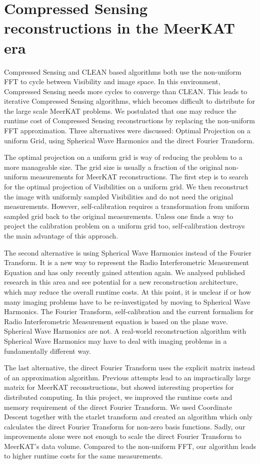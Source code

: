 \section{Compressed Sensing reconstructions in the MeerKAT era}
Compressed Sensing and CLEAN based algorithms both use the non-uniform FFT to cycle between Visibility and image space. In this environment, Compressed Sensing needs more cycles to converge than CLEAN. This leads to iterative Compressed Sensing algorithms, which becomes difficult to distribute for the large scale MeerKAT problems. We postulated that one may reduce the runtime cost of Compressed Sensing reconstructions by replacing the non-uniform FFT approximation. Three alternatives were discussed: Optimal Projection on a uniform Grid, using Spherical Wave Harmonics and the direct Fourier Transform.

The optimal projection on a uniform grid is way of reducing the problem to a more manageable size. The grid size is usually a fraction of the original non-uniform measurements for MeerKAT reconstructions. The first step is to search for the optimal projection of Visibilities on a uniform grid. We then reconstruct the image with uniformly sampled Visibilities and do not need the original measurements. However, self-calibration requires a transformation from uniform sampled grid back to the original measurements. Unless one finds a way to project the calibration problem on a uniform grid too, self-calibration destroys the main advantage of this approach.

The second alternative is using Spherical Wave Harmonics instead of the Fourier Transform. It is a new way to represent the Radio Interferometric Measurement Equation and has only recently gained attention again. We analysed published research in this area\cite{carozzi2015imaging, mcewen2008simulating} and see potential for a new reconstruction architecture, which may reduce the overall runtime costs. At this point, it is unclear if or how many imaging problems have to be re-investigated by moving to Spherical Wave Harmonics. The Fourier Transform, self-calibration and the current formalism for Radio Interferometric Measurement equation is based on the plane wave\cite{smirnov2011revisiting}. Spherical Wave Harmonics are not. A real-world reconstruction algorithm with Spherical Wave Harmonics may have to deal with imaging problems in a fundamentally different way.

The last alternative, the direct Fourier Transform uses the explicit matrix instead of an approximation algorithm. Previous attempts\cite{hardy2013direct} lead to an impractically large matrix for MeerKAT reconstructions, but showed interesting properties for distributed computing. In this project, we improved the runtime costs and memory requirement of the direct Fourier Transform. We used Coordinate Descent together with the starlet transform and created an algorithm which only calculates the direct Fourier Transform for non-zero basis functions. Sadly, our improvements alone were not enough to scale the direct Fourier Transform to MeerKAT's data volume. Compared to the non-uniform FFT, our algorithm leads to higher runtime costs for the same measurements. 


